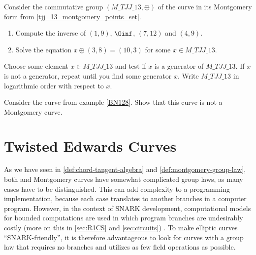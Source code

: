 \begin{exercise}
Consider the commutative group $(\mathit{M\_TJJ\_13},\oplus)$ of the  curve in its Montgomery form from \examplename{} \eqref{tjj_13_montgomery_points_set}. 
\begin{enumerate}
\item Compute the inverse of $(1,9)$, $\Oinf$, $(7,12)$ and $(4,9)$.
\item Solve the equation $x \oplus (3,8) = (10,3) $ for some $x\in \mathit{M\_TJJ\_13}$.
\end{enumerate}
Choose some element $x\in \mathit{M\_TJJ\_13}$ and test if $x$ is a generator of $\mathit{M\_TJJ\_13}$. If $x$ is not a generator, repeat until you find some generator $x$. Write $\mathit{M\_TJJ\_13}$ in logarithmic order with respect to $x$.
\end{exercise}
\begin{exercise}
Consider the curve  from example \ref{BN128}. Show that this curve is not a Montgomery curve.
\end{exercise}

\section{Twisted Edwards Curves}\label{sec:edwards}
As we have seen in  \ref{def:chord-tangent-algebra} and  \ref{def:montgomery-group-law}, both  and Montgomery curves have somewhat complicated group laws, as many cases have to be distinguished. This can add complexity to a programming implementation, because each case translates to another branches in a computer program. However, in the context of SNARK development, computational models for bounded computations are used in which program branches are undesirably costly (more on this in \secname{} \ref{sec:R1CS} and \ref{sec:circuits}) .  To make elliptic curves ``SNARK-friendly'', it is therefore advantageous to look for curves with a group law that requires no branches and utilizes as few field operations as possible.

